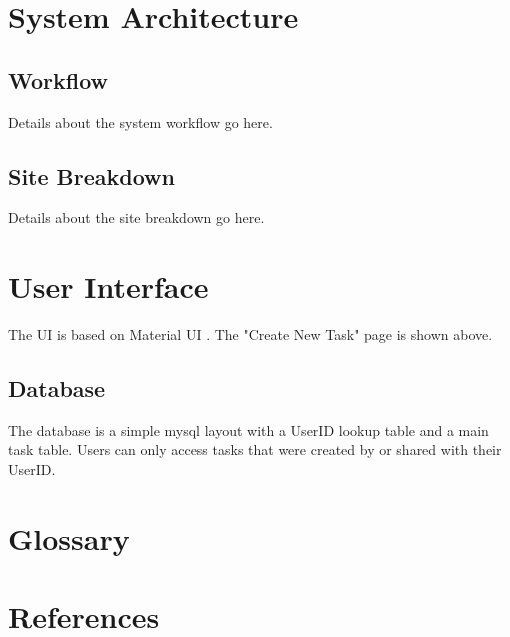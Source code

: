 \documentclass{article}
\begin{document}
\section{System Architecture}
\subsection{Workflow}
Details about the system workflow go here.

\subsection{Site Breakdown}
Details about the site breakdown go here.

\section{User Interface}
The UI is based on Material UI \cite{material_ui}. The "Create New Task" page is shown above.

\subsection{Database}
The database is a simple \gls{mysql} layout with a UserID lookup table and a main task table. Users can only access tasks that were created by or shared with their UserID.

\section{Glossary}
\printglossaries

\section{References}
\printbibliography
\end{document}
